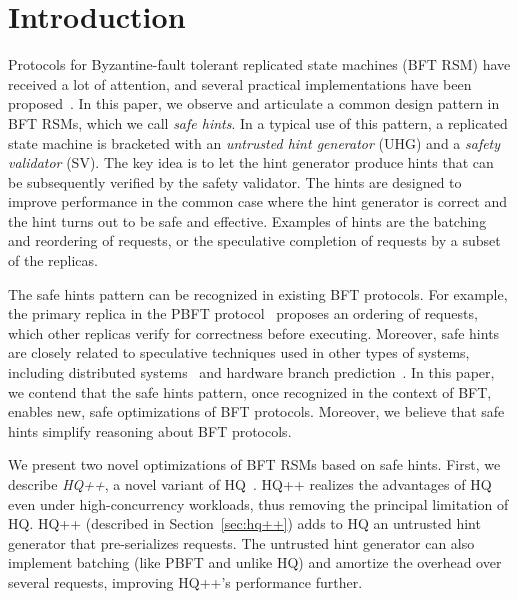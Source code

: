 \documentclass[twocolumn,10pt]{article}
\begin{document}
\section{Introduction}
\label{sec:introduction}

Protocols for Byzantine-fault tolerant replicated state machines (BFT
RSM) have received a lot of attention, and several practical
implementations have been proposed~\cite{Castro1999, fault-scalable-sosp-05,
hq-replication-osdi-06}. In this paper, we observe
and articulate a common design pattern in BFT RSMs, which we call
\emph{safe hints}. In a typical use of this pattern, a replicated state 
machine is bracketed with an \emph{untrusted hint generator} (UHG) and
a \emph{safety validator} (SV).  The key idea is to let the hint
generator produce hints that can be subsequently verified by the
safety validator.  The hints are designed to improve performance in the
common case where the hint generator is correct and the hint turns out
to be safe and effective.  Examples of hints are the batching and
reordering of requests, or the speculative completion of requests by a
subset of the replicas.

The safe hints pattern can be recognized in existing BFT protocols.  For
example, the primary replica in the PBFT protocol~\cite{Castro1999}
proposes an ordering of requests, which other replicas verify for
correctness before executing. Moreover, safe hints are closely related
to speculative techniques used in other types of systems, including
distributed systems~\cite{Speculator-sosp-05} and hardware branch
prediction~\cite{Hardware-compiler-branch}. In this paper, we contend
that the safe hints pattern, once recognized in the context of BFT,
enables new, safe optimizations of BFT protocols. Moreover, we believe
that safe hints simplify reasoning about BFT protocols.

We present two novel optimizations of BFT RSMs based on safe hints.
First, we describe \emph{HQ++}, a novel variant of HQ~\cite{hq-replication-osdi-06}. HQ++
realizes the advantages of HQ even under high-concurrency workloads,
thus removing the principal limitation of HQ. HQ++ (described in
Section~\ref{sec:hq++}) adds to HQ an untrusted hint generator that
pre-serializes requests. The untrusted hint generator can also implement 
batching (like PBFT and unlike HQ) and amortize the overhead over several requests, 
improving HQ++'s performance further.

\end{document}
